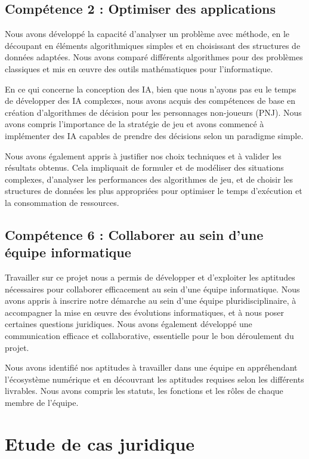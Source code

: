 \subsection{Compétence 2 : Optimiser des applications}

Nous avons développé la capacité d'analyser un problème avec méthode, en le découpant en éléments algorithmiques simples et en choisissant des structures de données adaptées. Nous avons comparé différents algorithmes pour des problèmes classiques et mis en œuvre des outils mathématiques pour l'informatique.

En ce qui concerne la conception des IA, bien que nous n'ayons pas eu le temps de développer des IA complexes, nous avons acquis des compétences de base en création d'algorithmes de décision pour les personnages non-joueurs (PNJ). Nous avons compris l'importance de la stratégie de jeu et avons commencé à implémenter des IA capables de prendre des décisions selon un paradigme simple.

Nous avons également appris à justifier nos choix techniques et à valider les résultats obtenus. Cela impliquait de formuler et de modéliser des situations complexes, d'analyser les performances des algorithmes de jeu, et de choisir les structures de données les plus appropriées pour optimiser le temps d'exécution et la consommation de ressources.

\subsection{Compétence 6 : Collaborer au sein d’une équipe informatique}

Travailler sur ce projet nous a permis de développer et d'exploiter les aptitudes nécessaires pour collaborer efficacement au sein d'une équipe informatique. Nous avons appris à inscrire notre démarche au sein d'une équipe pluridisciplinaire, à accompagner la mise en œuvre des évolutions informatiques, et à nous poser certaines questions juridiques. Nous avons également développé une communication efficace et collaborative, essentielle pour le bon déroulement du projet.

Nous avons identifié nos aptitudes à travailler dans une équipe en appréhendant l'écosystème numérique et en découvrant les aptitudes requises selon les différents livrables. Nous avons compris les statuts, les fonctions et les rôles de chaque membre de l'équipe.

\section{Etude de cas juridique}

